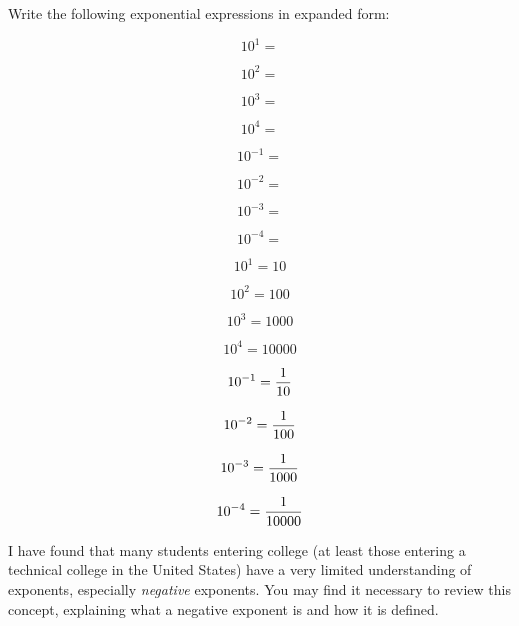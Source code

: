 

Write the following exponential expressions in expanded form:

$$10^1 = $$

$$10^2 = $$

$$10^3 = $$

$$10^4 = $$

$$10^{-1} = $$

$$10^{-2} = $$

$$10^{-3} = $$

$$10^{-4} = $$







$$10^1 = 10$$

$$10^2 = 100$$

$$10^3 = 1000$$

$$10^4 = 10000$$

$$10^{-1} = {1 \over 10}$$

$$10^{-2} = {1 \over 100}$$

$$10^{-3} = {1 \over 1000}$$

$$10^{-4} = {1 \over 10000}$$







I have found that many students entering college (at least those entering a technical college in the United States) have a very limited understanding of exponents, especially {\it negative} exponents.  You may find it necessary to review this concept, explaining what a negative exponent is and how it is defined.




